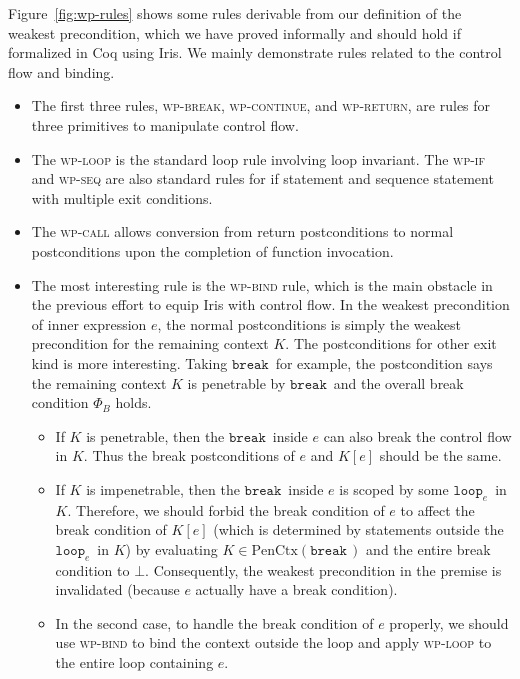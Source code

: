 \documentclass{article}
\numberwithin{algorithm}{section}
\newcommand{\cloop}[1]{\texttt{loop}_{#1}\,}
\newcommand{\cbreak}{\texttt{break}\,}
\newcommand{\pure}[1]{\text{PenCtx}(#1)}
\begin{document}
Figure~\ref{fig:wp-rules} shows some rules derivable from our definition of the weakest precondition, which we have proved informally and should hold if formalized in Coq using Iris.
We mainly demonstrate rules related to the control flow and binding.

\begin{itemize}
    \item The first three rules, \textsc{wp-break}, \textsc{wp-continue}, and \textsc{wp-return}, are rules for three primitives to manipulate control flow.
    \item The \textsc{wp-loop} is the standard loop rule involving loop invariant.
    The \textsc{wp-if} and \textsc{wp-seq} are also standard rules for if statement and sequence statement with multiple exit conditions.
    \item The \textsc{wp-call} allows conversion from return postconditions to normal postconditions upon the completion of function invocation.
    \item The most interesting rule is the \textsc{wp-bind} rule, which is the main obstacle in the previous effort to equip Iris with control flow.
    In the weakest precondition of inner expression $e$, the normal postconditions is simply the weakest precondition for the remaining context $K$.
    The postconditions for other exit kind is more interesting. Taking $\cbreak\!$ for example, the postcondition says the remaining context $K$ is penetrable by $\cbreak\!$ and the overall break condition $\Phi_B$ holds. \begin{itemize}
        \item If $K$ is penetrable, then the $\cbreak\!$ inside $e$ can also break the control flow in $K$. Thus the break postconditions of $e$ and $K[e]$ should be the same.
        \item If $K$ is impenetrable, then the $\cbreak\!$ inside $e$ is scoped by some $\cloop{e}\!$ in $K$. Therefore, we should forbid the break condition of $e$ to affect the break condition of $K[e]$ (which is determined by statements outside the $\cloop{e}\!$ in $K$) by evaluating $K \in \pure{\cbreak\!}$ and the entire break condition to $\bot$.
        Consequently, the weakest precondition in the premise is invalidated (because $e$ actually have a break condition).
        \item In the second case, to handle the break condition of $e$ properly, we should use \textsc{wp-bind} to bind the context outside the loop and apply \textsc{wp-loop} to the entire loop containing $e$.
    \end{itemize}
\end{itemize}
\end{document}
